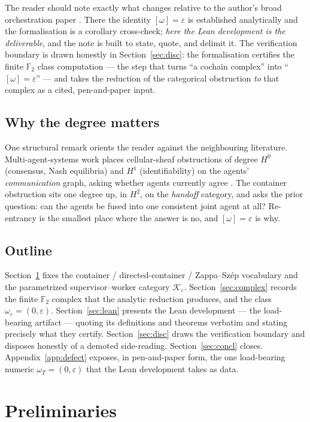 \documentclass[11pt]{amsart}
\theoremstyle{definition}
\theoremstyle{remark}
\newcommand{\K}{\mathcal{K}}
\newcommand{\FF}{\mathbb{F}_2}
\begin{document}
The reader should note exactly what changes relative to the author's broad orchestration paper
\cite{orchestration}. There the identity $[\omega]=\varepsilon$ is established analytically and the
formalisation is a corollary cross-check; \emph{here the Lean development is the deliverable}, and the
note is built to state, quote, and delimit it. The verification boundary is drawn honestly in
Section~\ref{sec:disc}: the formalisation certifies the finite $\FF$ class computation --- the step
that turns ``a cochain complex'' into ``$[\omega]=\varepsilon$'' --- and takes the reduction of the
categorical obstruction \emph{to} that complex as a cited, pen-and-paper input.

\subsection*{Why the degree matters}
One structural remark orients the reader against the neighbouring literature. Multi-agent-systems work
places cellular-sheaf obstructions of degree $H^0$ (consensus, Nash equilibria) and $H^1$
(identifiability) on the agents' \emph{communication} graph, asking whether agents currently agree
\cite{sheafMAS,sheafID}. The container obstruction sits one degree up, in $H^2$, on the \emph{handoff}
category, and asks the prior question: can the agents be fused into one consistent joint agent at all?
Re-entrancy is the smallest place where the answer is no, and $[\omega]=\varepsilon$ is why.

\subsection*{Outline}
Section~\ref{sec:prelim} fixes the container / directed-container / Zappa--Sz\'ep vocabulary and the
parametrized supervisor--worker category $\K_\varepsilon$. Section~\ref{sec:complex} records the
finite $\FF$ complex that the analytic reduction produces, and the class $\omega_\varepsilon=(0,
\varepsilon)$. Section~\ref{sec:lean} presents the Lean development --- the load-bearing artifact ---
quoting its definitions and theorems verbatim and stating precisely what they certify.
Section~\ref{sec:disc} draws the verification boundary and disposes honestly of a demoted side-reading.
Section~\ref{sec:concl} closes. Appendix~\ref{app:defect} exposes, in pen-and-paper form, the one
load-bearing numeric $\omega_T=(0,\varepsilon)$ that the Lean development takes as data.

\section{Preliminaries}\label{sec:prelim}
\end{document}
